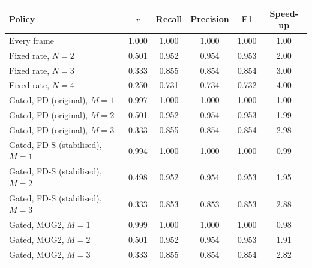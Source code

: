 \begin{tabular}{@{}lccccc@{}}
\toprule
Policy & $r$ & Recall & Precision & F1 & Speed-up \\
\midrule
Every frame & 1.000 & 1.000 & 1.000 & 1.000 & 1.00 \\
Fixed rate, $N=2$ & 0.501 & 0.952 & 0.954 & 0.953 & 2.00 \\
Fixed rate, $N=3$ & 0.333 & 0.855 & 0.854 & 0.854 & 3.00 \\
Fixed rate, $N=4$ & 0.250 & 0.731 & 0.734 & 0.732 & 4.00 \\
Gated, FD (original), $M=1$ & 0.997 & 1.000 & 1.000 & 1.000 & 1.00 \\
Gated, FD (original), $M=2$ & 0.501 & 0.952 & 0.954 & 0.953 & 1.99 \\
Gated, FD (original), $M=3$ & 0.333 & 0.855 & 0.854 & 0.854 & 2.98 \\
Gated, FD-S (stabilised), $M=1$ & 0.994 & 1.000 & 1.000 & 1.000 & 0.99 \\
Gated, FD-S (stabilised), $M=2$ & 0.498 & 0.952 & 0.954 & 0.953 & 1.95 \\
Gated, FD-S (stabilised), $M=3$ & 0.333 & 0.853 & 0.853 & 0.853 & 2.88 \\
Gated, MOG2, $M=1$ & 0.999 & 1.000 & 1.000 & 1.000 & 0.98 \\
Gated, MOG2, $M=2$ & 0.501 & 0.952 & 0.954 & 0.953 & 1.91 \\
Gated, MOG2, $M=3$ & 0.333 & 0.855 & 0.854 & 0.854 & 2.82 \\
\bottomrule
\end{tabular}
